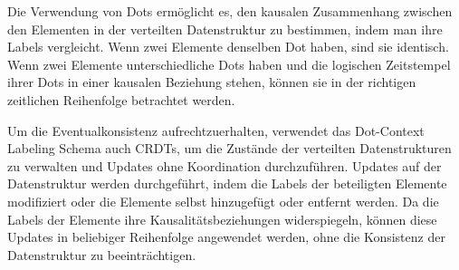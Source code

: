 Die Verwendung von Dots ermöglicht es, den kausalen Zusammenhang zwischen den Elementen in der verteilten Datenstruktur zu bestimmen, indem man ihre Labels vergleicht. Wenn zwei Elemente denselben Dot haben, sind sie identisch. Wenn zwei Elemente unterschiedliche Dots haben und die logischen Zeitstempel ihrer Dots in einer kausalen Beziehung stehen, können sie in der richtigen zeitlichen Reihenfolge betrachtet werden.

Um die Eventualkonsistenz aufrechtzuerhalten, verwendet das Dot-Context Labeling Schema auch CRDTs, um die Zustände der verteilten Datenstrukturen zu verwalten und Updates ohne Koordination durchzuführen. Updates auf der Datenstruktur werden durchgeführt, indem die Labels der beteiligten Elemente modifiziert oder die Elemente selbst hinzugefügt oder entfernt werden. Da die Labels der Elemente ihre Kausalitätsbeziehungen widerspiegeln, können diese Updates in beliebiger Reihenfolge angewendet werden, ohne die Konsistenz der Datenstruktur zu beeinträchtigen.

